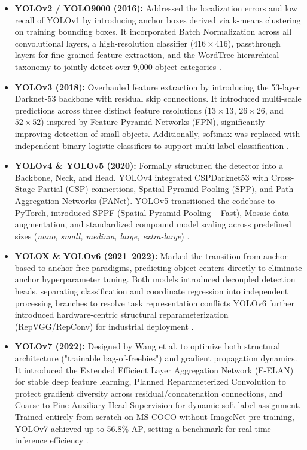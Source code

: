 \begin{itemize}
    \item \textbf{YOLOv2 / YOLO9000 (2016):} Addressed the localization errors and low recall of YOLOv1 by introducing anchor boxes derived via k-means clustering on training bounding boxes. It incorporated Batch Normalization across all convolutional layers, a high-resolution classifier ($416 \times 416$), passthrough layers for fine-grained feature extraction, and the WordTree hierarchical taxonomy to jointly detect over 9{,}000 object categories \parencite{redmon_yolo9000, ramos_yoloreview}.

    \item \textbf{YOLOv3 (2018):} Overhauled feature extraction by introducing the 53-layer Darknet-53 backbone with residual skip connections. It introduced multi-scale predictions across three distinct feature resolutions ($13 \times 13$, $26 \times 26$, and $52 \times 52$) inspired by Feature Pyramid Networks (FPN), significantly improving detection of small objects. Additionally, softmax was replaced with independent binary logistic classifiers to support multi-label classification \parencite{redmon_yolov3, ramos_yoloreview}.

    \item \textbf{YOLOv4 \& YOLOv5 (2020):} Formally structured the detector into a Backbone, Neck, and Head. YOLOv4 integrated CSPDarknet53 with Cross-Stage Partial (CSP) connections, Spatial Pyramid Pooling (SPP), and Path Aggregation Networks (PANet). YOLOv5 transitioned the codebase to PyTorch, introduced SPPF (Spatial Pyramid Pooling -- Fast), Mosaic data augmentation, and standardized compound model scaling across predefined sizes (\textit{nano, small, medium, large, extra-large}) \parencite{ramos_yoloreview}.

    \item \textbf{YOLOX \& YOLOv6 (2021--2022):} Marked the transition from anchor-based to anchor-free paradigms, predicting object centers directly to eliminate anchor hyperparameter tuning. Both models introduced decoupled detection heads, separating classification and coordinate regression into independent processing branches to resolve task representation conflicts YOLOv6 further introduced hardware-centric structural reparameterization (RepVGG/RepConv) for industrial deployment \parencite{ramos_yoloreview}.
    
    \item \textbf{YOLOv7 (2022):} Designed by Wang et al. to optimize both structural architecture ("trainable bag-of-freebies") and gradient propagation dynamics. It introduced the Extended Efficient Layer Aggregation Network (E-ELAN) for stable deep feature learning, Planned Reparameterized Convolution to protect gradient diversity across residual/concatenation connections, and Coarse-to-Fine Auxiliary Head Supervision for dynamic soft label assignment. Trained entirely from scratch on MS COCO without ImageNet pre-training, YOLOv7 achieved up to 56.8\% AP, setting a benchmark for real-time inference efficiency \parencite{wang_yolov7, ramos_yoloreview}.


\end{itemize}
